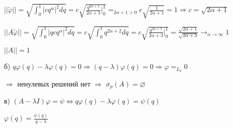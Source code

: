 \documentclass[russian]{article}
\begin{document}
$||\widetilde{\varphi}||=\sqrt{\int_{0}^{1}|cq^{\alpha}|^{2}dq}=c\sqrt{\frac{q^{2\alpha+1}}{2\alpha+1}|_{0}^{1}}=_{2\alpha+1>0}c\sqrt{\frac{1}{2\alpha+1}}=1\Rightarrow c=\sqrt{2\alpha+1}$

$||A\widetilde{\varphi}||=\sqrt{\int_{0}^{1}|qcq^{\alpha}|^{2}dq}=c\sqrt{\int_{0}^{1}q^{2\alpha+2}dq}=c\sqrt{\frac{q^{2\alpha+3}}{2\alpha+3}|_{0}^{1}}=\frac{\sqrt{2\alpha+1}}{\sqrt{2\alpha+3}}\rightarrow_{\alpha\rightarrow\infty}1$

$||A||=1$

б) $q\varphi(q)-\lambda\varphi(q)=0\Rightarrow(q-\lambda)\varphi(q)=0\Rightarrow\varphi=_{L_{2}}0$

$\Rightarrow$ ненулевых решений нет $\Rightarrow$ $\sigma_{p}(A)=\varnothing$

в) $(A-\lambda I)\varphi=\psi\Leftrightarrow q\varphi(q)-\lambda\varphi(q)=\psi(q)$

$\varphi(q)=\frac{\psi(q)}{q-\lambda}$
\end{document}
